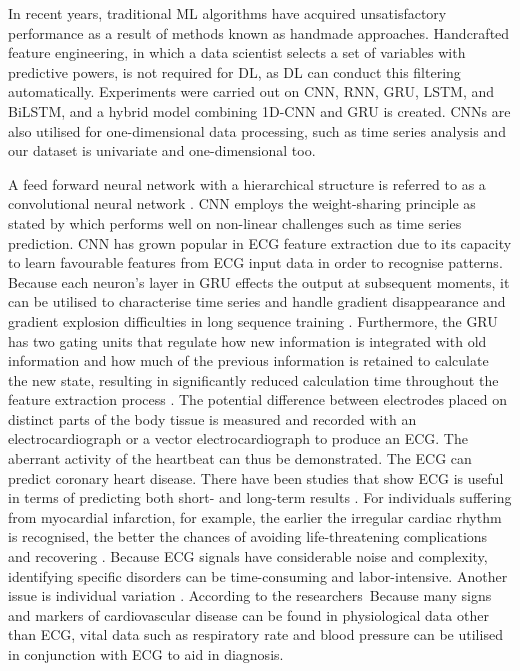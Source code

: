 \documentclass[a4paper, fleqn]{cas-sc}
\begin{document}
\par In recent years,  traditional ML algorithms have acquired unsatisfactory performance as a result of methods known as handmade approaches. Handcrafted feature engineering, in which a data scientist selects a set of variables with predictive powers,  is not required for DL,  as DL can conduct this filtering automatically. Experiments were carried out on CNN,  RNN,  GRU,  LSTM,  and BiLSTM, and a hybrid model combining 1D-CNN and GRU is created. CNNs are also utilised for one-dimensional data processing,  such as time series analysis \cite{sajjad2020novel} and our dataset is univariate and one-dimensional too. \par A feed forward neural network with a hierarchical structure is referred to as a convolutional neural network \cite{chua1998cnn}. CNN employs the weight-sharing principle as stated by \cite{qiu2018variety} which performs well on non-linear challenges such as time series prediction. CNN has grown popular in ECG feature extraction due to its capacity to learn favourable features from ECG input data in order to recognise patterns\cite{wang2023inter}. Because each neuron's layer in GRU effects the output at subsequent moments,  it can be utilised to characterise time series and handle gradient disappearance and gradient explosion difficulties in long sequence training \cite{dey2017gate}. Furthermore,  the GRU has two gating units that regulate how new information is integrated with old information and how much of the previous information is retained to calculate the new state,  resulting in significantly reduced calculation time throughout the feature extraction process \cite{yao2021interpretation}. The potential difference between electrodes placed on distinct parts of the body tissue is measured and recorded with an electrocardiograph or a vector electrocardiograph to produce an ECG. The aberrant activity of the heartbeat can thus be demonstrated\cite{liu2021deep}. The ECG can predict coronary heart disease. There have been studies that show ECG is useful in terms of predicting both short- and long-term results
. For individuals suffering from myocardial infarction,  for example,  the earlier the irregular cardiac rhythm is recognised,  the better the chances of avoiding life-threatening complications and recovering \cite{pollard2000acute}. Because ECG signals have considerable noise and complexity,  identifying specific disorders can be time-consuming and labor-intensive. Another issue is individual variation \cite{de2011weighted}. According to the researchers Because many signs and markers of cardiovascular disease can be found in physiological data other than ECG,  vital data such as respiratory rate and blood pressure can be utilised in conjunction with ECG to aid in diagnosis.
\end{document}
